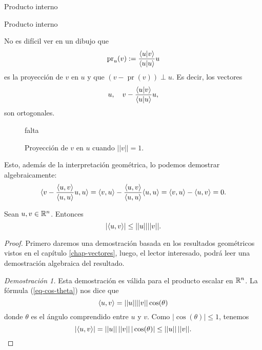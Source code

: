 \begin{chapter}{Producto interno}
\begin{section}{Producto interno}
        \medskip
        
        \begin{observacion}\label{obs-proyeccion-ort}
            No es difícil ver en un dibujo que 
            \begin{equation*}
                \operatorname{pr}_u(v) := \frac{\langle u|v\rangle}{\langle u|u\rangle}u
            \end{equation*}
             es la proyección de $v$ en $u$ y que   $(v - \operatorname{pr}(v)) \perp u$. Es decir,   los vectores
            \begin{equation*}
                    u, \quad   v - \frac{\langle u|v\rangle}{\langle u|u\rangle}u,
            \end{equation*}
            son ortogonales.
            \begin{figure}[h]
            	\centering
                falta
                \caption{Proyección de $v$ en $u$ cuando $||v||=1$.}\label{fig-proyeccion-ort}
            \end{figure}
        
        
            Esto,  además de la interpretación geométrica, lo podemos demostrar algebraicamente:
            \begin{equation*}
            \langle v - \frac{\langle u,v\rangle}{\langle u,u\rangle} u , u \rangle =
            \langle v , u \rangle  -\frac{\langle u,v\rangle}{\langle u,u\rangle}\langle u , u \rangle =  \langle v , u \rangle -  \langle u , v \rangle =0.
            \end{equation*}
            
        \end{observacion}
        
        \begin{proposicion}\label{prop-cauchy-schwarz} Sean $u, v\in \mathbb R^n$. Entonces 
            $$|\langle u, v \rangle| \le ||u||||v||.$$
        \end{proposicion}
        \begin{proof} Primero daremos una demostración basada en los resultados geométricos vistos en el capítulo \ref{chap-vectores}, luego,  el lector interesado, podrá leer una demostración algebraica del resultado. 
        
        \textit{Demostración 1.} Esta demostración es válida para el producto escalar en $\mathbb R^n$. La fórmula (\ref{eq-cos-theta}) nos dice que 
        \begin{equation*}
            \langle u, v \rangle = ||u||||v||\cos(\theta)
        \end{equation*}
        donde $\theta$ es el ángulo comprendido entre $u$ y $v$. Como $|\cos(\theta)| \le 1$,  tenemos
        \begin{equation*}
            |\langle u, v \rangle| = ||u||\,||v||\,|\cos(\theta)| \le  ||u||\,||v||.
        \end{equation*}
        

\end{proof}
\end{section}
\end{chapter}
